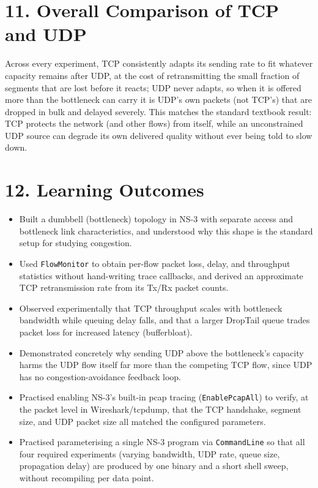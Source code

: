 \documentclass[11pt]{article}
\begin{document}
\section*{11. Overall Comparison of TCP and UDP}
Across every experiment, TCP consistently adapts its sending rate to fit
whatever capacity remains after UDP, at the cost of retransmitting the small
fraction of segments that are lost before it reacts; UDP never adapts, so
when it is offered more than the bottleneck can carry it is UDP's own
packets (not TCP's) that are dropped in bulk and delayed severely. This
matches the standard textbook result: TCP protects the network (and other
flows) from itself, while an unconstrained UDP source can degrade its own
delivered quality without ever being told to slow down.

\section*{12. Learning Outcomes}
\begin{itemize}
  \item Built a dumbbell (bottleneck) topology in NS-3 with separate access
        and bottleneck link characteristics, and understood why this shape
        is the standard setup for studying congestion.
  \item Used \texttt{FlowMonitor} to obtain per-flow packet loss, delay, and
        throughput statistics without hand-writing trace callbacks, and
        derived an approximate TCP retransmission rate from its Tx/Rx packet
        counts.
  \item Observed experimentally that TCP throughput scales with bottleneck
        bandwidth while queuing delay falls, and that a larger DropTail
        queue trades packet loss for increased latency (bufferbloat).
  \item Demonstrated concretely why sending UDP above the bottleneck's
        capacity harms the UDP flow itself far more than the competing TCP
        flow, since UDP has no congestion-avoidance feedback loop.
  \item Practised enabling NS-3's built-in pcap tracing
        (\texttt{EnablePcapAll}) to verify, at the packet level in
        Wireshark/tcpdump, that the TCP handshake, segment size, and UDP
        packet size all matched the configured parameters.
  \item Practised parameterising a single NS-3 program via
        \texttt{CommandLine} so that all four required experiments (varying
        bandwidth, UDP rate, queue size, propagation delay) are produced by
        one binary and a short shell sweep, without recompiling per data
        point.
\end{itemize}
\end{document}

